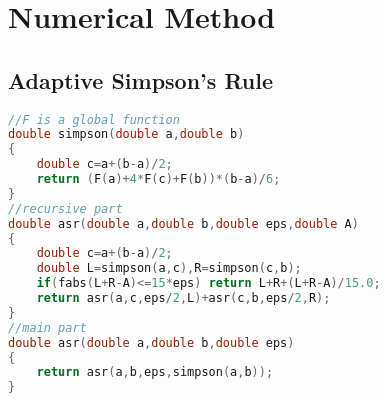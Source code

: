  \section{Numerical Method}
  \subsection{Adaptive Simpson's Rule}
  \begin{lstlisting}[language=C++]
//F is a global function
double simpson(double a,double b)
{
	double c=a+(b-a)/2;
	return (F(a)+4*F(c)+F(b))*(b-a)/6;
}
//recursive part
double asr(double a,double b,double eps,double A)
{
	double c=a+(b-a)/2;
	double L=simpson(a,c),R=simpson(c,b);
	if(fabs(L+R-A)<=15*eps) return L+R+(L+R-A)/15.0;
	return asr(a,c,eps/2,L)+asr(c,b,eps/2,R);
}
//main part
double asr(double a,double b,double eps)
{
	return asr(a,b,eps,simpson(a,b));
}
  \end{lstlisting}


\endinput